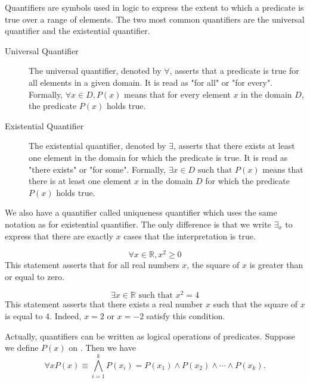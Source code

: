 \begin{definition}[Quantifier]

Quantifiers are symbols used in logic to express the extent to which a predicate is true over a range of elements. The two most common quantifiers are the universal quantifier and the existential quantifier.

\begin{description}
    \item[Universal Quantifier] The universal quantifier, denoted by $\forall$, asserts that a predicate is true for all elements in a given domain. It is read as "for all" or "for every". Formally, $\forall x \in D, P(x)$ means that for every element $x$ in the domain $D$, the predicate $P(x)$ holds true.
    \item[Existential Quantifier] The existential quantifier, denoted by $\exists$, asserts that there exists at least one element in the domain for which the predicate is true. It is read as "there exists" or "for some". Formally, $\exists x \in D \text{ such that } P(x)$ means that there is at least one element $x$ in the domain $D$ for which the predicate $P(x)$ holds true.
\end{description}
\end{definition}
\begin{remark}
    We also have a quantifier called uniqueness quantifier which uses the same notation as for existential quantifier. The only difference is that we write $\exists_x$ to express that there are exactly $x$ cases that the interpretation is true.
\end{remark}
\begin{example}
\begin{equation*}
    \forall x \in \mathbb{R}, x^2 \geq 0
\end{equation*}
This statement asserts that for all real numbers $x$, the square of $x$ is greater than or equal to zero.
\end{example}
\begin{example}
\begin{equation*}
    \exists x \in \mathbb{R} \text{ such that } x^2 = 4
\end{equation*}
This statement asserts that there exists a real number $x$ such that the square of $x$ is equal to 4. Indeed, $x = 2$ or $x = -2$ satisfy this condition.
\end{example}

Actually, quantifiers can be written as logical operations of predicates. Suppose we define $P(x)$ on . Then we have
\[\forall x P(x) \equiv \bigwedge_{i=1}^{k} P(x_i) = P(x_1)\land P(x_2)\land \cdots \land P(x_k).\]

